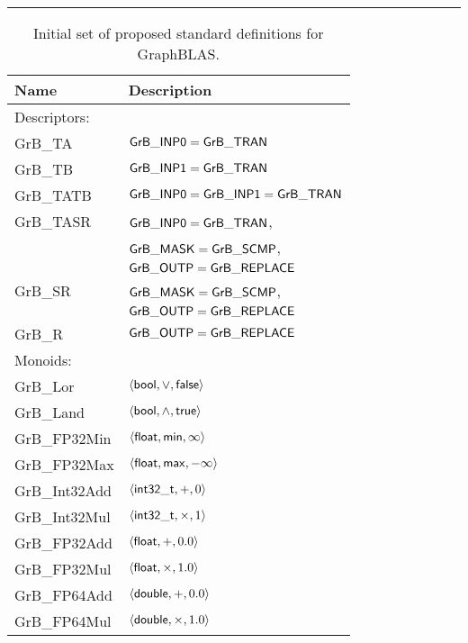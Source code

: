 \begin{table}[bt]
	\hrule
	\caption{Initial set of proposed standard definitions for GraphBLAS.}
	\label{Tab:stddef}
	\begin{center}
	\begin{tabular}{|l|l|} \hline
		 Name				& Description \\ \hline
         Descriptors:  & 	\\
				{\sf GrB\_TA} 	 \rule{0pt}{3ex}	& ${\sf GrB\_INP0} = {\sf GrB\_TRAN}$ \\
                {\sf GrB\_TB}			& ${\sf GrB\_INP1} = {\sf GrB\_TRAN}$ \\ 
				{\sf GrB\_TATB}	 \rule{0pt}{3ex}	& ${\sf GrB\_INP0} = {\sf GrB\_INP1} = {\sf GrB\_TRAN}$ \\
				{\sf GrB\_TASR}	 \rule{0pt}{3ex}	& ${\sf GrB\_INP0} = {\sf GrB\_TRAN}$, \\
							& ${\sf GrB\_MASK} = {\sf GrB\_SCMP}$, \\
							& ${\sf GrB\_OUTP} = {\sf GrB\_REPLACE}$ \\
				{\sf GrB\_SR} \rule{0pt}{3ex}		& ${\sf GrB\_MASK} = {\sf GrB\_SCMP}$, \\
							& ${\sf GrB\_OUTP} = {\sf GrB\_REPLACE}$ \\
				{\sf GrB\_R} \rule{0pt}{3ex}		& ${\sf GrB\_OUTP} = {\sf GrB\_REPLACE}$ \\ \hline
		Monoids:	& 	\\
				{\sf GrB\_Lor}	 \rule{0pt}{3ex}	& $\left\langle {\sf bool}, \vee, {\sf false} \right\rangle$ \\
				{\sf GrB\_Land}		& $\left\langle {\sf bool}, \wedge, {\sf true} \right\rangle$ \\
				{\sf GrB\_FP32Min}		& $\left\langle {\sf float}, {\sf min}, \infty \right\rangle$ \\
				{\sf GrB\_FP32Max}		& $\left\langle {\sf float}, {\sf max}, -\infty \right\rangle$ \\
				{\sf GrB\_Int32Add}		& $\left\langle {\sf int32\_t}, +, 0 \right\rangle$ \\
                {\sf GrB\_Int32Mul}		& $\left\langle {\sf int32\_t}, \times, 1 \right\rangle$ \\
				{\sf GrB\_FP32Add}		& $\left\langle {\sf float}, +, 0.0 \right\rangle$ \\
				{\sf GrB\_FP32Mul}		& $\left\langle {\sf float}, \times, 1.0 \right\rangle$ \\
				{\sf GrB\_FP64Add}		& $\left\langle {\sf double}, +, 0.0 \right\rangle$ \\ 
				{\sf GrB\_FP64Mul}		& $\left\langle {\sf double}, \times, 1.0 \right\rangle$ \\ \hline

\end{tabular}
\end{center}
\end{table}
